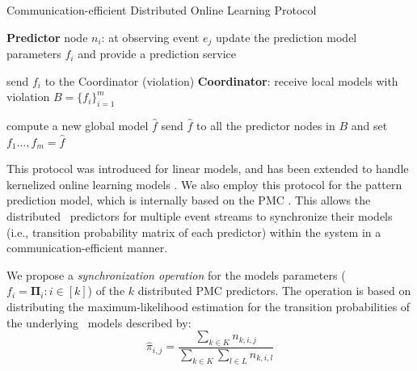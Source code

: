 \begin{algorithm}[h]
	\caption{Communication-efficient Distributed Online Learning Protocol } 
	\begin{algorithmic}[1] 
		\Statex  \Indm  \textbf{Predictor} node $n_i$: at observing event $e_j$
		\Statex \Indp update the prediction model parameters $f_i$ and provide a prediction service 

		\Statex {}  
		\Statex send  $f_i$ to the Coordinator (violation) 
		\Statex \Indm \textbf{Coordinator}:
		\Statex \Indp receive local models with violation
		 $B=\{f_i\}_{i=1}^m$
	
	
		\Statex {}
        \Statex
		\Statex compute a new global model $\hat{f}$ 
		\Statex send $\hat{f}$ to all the predictor nodes in $B$ and set $f_{1}\dots, f_{m}=\hat{f} $ 
		\Statex {}
	\end{algorithmic}
	\label{algonline:dol}
\end{algorithm}


\par This protocol was introduced for linear models, and has been  extended to handle kernelized online learning models \cite{kamp2016communication}. We also employ this protocol for the pattern prediction model, which is internally based on the PMC \pmcmr. This allows the distributed \pmcmr\ predictors for multiple event streams to  synchronize their models (i.e., transition probability matrix of each predictor) within the system in a communication-efficient manner. 



\par We propose a \textit{synchronization operation} for the models parameters ($f_i=\boldsymbol{\Pi}_i :i \in[k]$) of the $k$ distributed PMC predictors. The operation is based on distributing the maximum-likelihood estimation \cite{anderson1957statistical} for the transition probabilities of the underlying \pmcmr\ models described by: 
\begin{equation*}
\label{eq:dis_pi_estim}
\hat{\pi}_{i,j}=\frac{\sum_{k \in K} n_{k,i,j}}{\sum_{k \in K} \sum_{l \in L} n_{k,i,l}}
\end{equation*}

